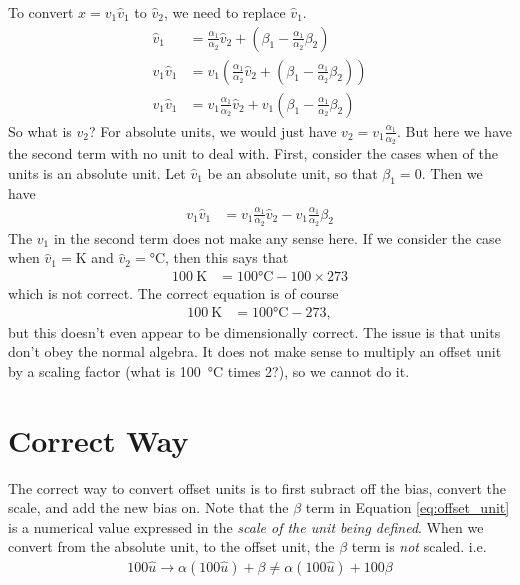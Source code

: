 \documentclass[letterpaper,10pt]{article}
\begin{document}
To convert $x = v_1 \hat{v}_1$ to $\hat{v}_2$, we need to replace $\hat{v}_1$.
\begin{align}
  \hat{v}_1 &= \frac{\alpha_1}{\alpha_2}\hat{v}_2  + \left( \beta_1- \frac{\alpha_1}{\alpha_2}\beta_2 \right) \\
  v_1 \hat{v}_1 &= v_1 \left(\frac{\alpha_1}{\alpha_2}\hat{v}_2  + \left( \beta_1- \frac{\alpha_1}{\alpha_2}\beta_2 \right)\right) \\
  v_1 \hat{v}_1 &= v_1 \frac{\alpha_1}{\alpha_2}\hat{v}_2  + v_1 \left( \beta_1- \frac{\alpha_1}{\alpha_2}\beta_2 \right)
\end{align}
So what is $v_2$? For absolute units, we would just have $v_2 = v_1\frac{\alpha_1}{\alpha_2}$. But here we have the second term
with no unit to deal with. First, consider the cases when of the units is an absolute unit. Let $\hat{v}_1$ be an absolute unit, so
that $\beta_1 = 0$. Then we have
\begin{align}
  v_1 \hat{v}_1 &= v_1 \frac{\alpha_1}{\alpha_2}\hat{v}_2  - v_1 \frac{\alpha_1}{\alpha_2}\beta_2
\end{align}
The $v_1$ in the second term does not make any sense here. If we consider the case when $\hat{v}_1 = \si{\kelvin}$ and $\hat{v}_2 = \si{\celsius}$,
then this says that
\begin{align}
  \SI{100}{\kelvin} &= 100 \si{\celsius}  - 100 \times 273
\end{align}
which is not correct. The correct equation is of course
\begin{align}
  \SI{100}{\kelvin} &= 100 \si{\celsius}  - 273,
\end{align}
but this doesn't even appear to be dimensionally correct. The issue is that units don't obey the normal algebra. It does not make sense to multiply
an offset unit by a scaling factor (what is \SI{100}{\celsius} times 2?), so we cannot do it.

\section{Correct Way}

The correct way to convert offset units is to first subract off the bias,
convert the scale, and add the new bias on.  Note that the $\beta$ term in
Equation \ref{eq:offset_unit} is a numerical value expressed in the \emph{scale
of the unit being defined}. When we convert from the absolute unit, to the offset unit,
the $\beta$ term is \emph{not} scaled. i.e.
\begin{align}
  100\hat{u} \rightarrow \alpha (100\hat{u}) + \beta \ne \alpha (100\hat{u}) + 100 \beta
\end{align}
\end{document}
